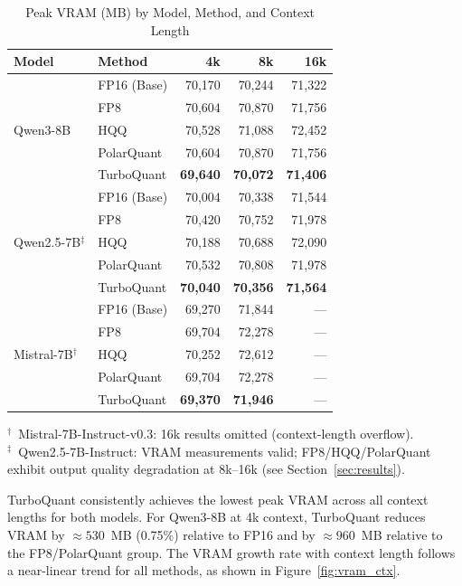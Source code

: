 \documentclass[10pt,twocolumn]{article}
\begin{document}
\begin{table}[h]
\caption{Peak VRAM (MB) by Model, Method, and Context Length}
\label{tab:vram}
\centering
\small
\setlength{\tabcolsep}{3.5pt}
\begin{tabular}{@{}llrrr@{}}
\toprule
\textbf{Model} & \textbf{Method} & \textbf{4k} & \textbf{8k} & \textbf{16k} \\
\midrule
\multirow{5}{*}{Qwen3-8B}
 & FP16 (Base) & 70,170 & 70,244 & 71,322 \\
 & FP8         & 70,604 & 70,870 & 71,756 \\
 & HQQ         & 70,528 & 71,088 & 72,452 \\
 & PolarQuant  & 70,604 & 70,870 & 71,756 \\
 & TurboQuant  & \textbf{69,640} & \textbf{70,072} & \textbf{71,406} \\
\midrule
\multirow{5}{*}{Qwen2.5-7B$^\ddagger$}
 & FP16 (Base) & 70,004 & 70,338 & 71,544 \\
 & FP8         & 70,420 & 70,752 & 71,978 \\
 & HQQ         & 70,188 & 70,688 & 72,090 \\
 & PolarQuant  & 70,532 & 70,808 & 71,978 \\
 & TurboQuant  & \textbf{70,040} & \textbf{70,356} & \textbf{71,564} \\
\midrule
\multirow{5}{*}{Mistral-7B$^\dagger$}
 & FP16 (Base) & 69,270 & 71,844 & --- \\
 & FP8         & 69,704 & 72,278 & --- \\
 & HQQ         & 70,252 & 72,612 & --- \\
 & PolarQuant  & 69,704 & 72,278 & --- \\
 & TurboQuant  & \textbf{69,370} & \textbf{71,946} & --- \\
\bottomrule
\end{tabular}
{\footnotesize\par\smallskip
${}^\dagger$~Mistral-7B-Instruct-v0.3: 16k results omitted (context-length overflow).\\
${}^\ddagger$~Qwen2.5-7B-Instruct: VRAM measurements valid; FP8/HQQ/PolarQuant exhibit
output quality degradation at 8k--16k (see Section~\ref{sec:results}).}
\end{table}

TurboQuant consistently achieves the lowest peak VRAM across all
context lengths for both models.
For Qwen3-8B at 4k context, TurboQuant reduces VRAM by
$\approx530$~MB (0.75\%) relative to FP16 and by $\approx960$~MB
relative to the FP8/PolarQuant group.
The VRAM growth rate with context length follows a near-linear trend
for all methods, as shown in Figure~\ref{fig:vram_ctx}.
\end{document}
